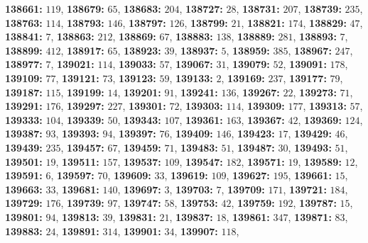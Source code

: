\textsf{\bfseries 138661:} $119$, \textsf{\bfseries 138679:} $65$, \textsf{\bfseries 138683:} $204$, \textsf{\bfseries 138727:} $28$, \textsf{\bfseries 138731:} $207$, \textsf{\bfseries 138739:} $235$, \textsf{\bfseries 138763:} $114$, \textsf{\bfseries 138793:} $146$, \textsf{\bfseries 138797:} $126$, \textsf{\bfseries 138799:} $21$, \textsf{\bfseries 138821:} $174$, \textsf{\bfseries 138829:} $47$, \textsf{\bfseries 138841:} $7$, \textsf{\bfseries 138863:} $212$, \textsf{\bfseries 138869:} $67$, \textsf{\bfseries 138883:} $138$, \textsf{\bfseries 138889:} $281$, \textsf{\bfseries 138893:} $7$, \textsf{\bfseries 138899:} $412$, \textsf{\bfseries 138917:} $65$, \textsf{\bfseries 138923:} $39$, \textsf{\bfseries 138937:} $5$, \textsf{\bfseries 138959:} $385$, \textsf{\bfseries 138967:} $247$, \textsf{\bfseries 138977:} $7$, \textsf{\bfseries 139021:} $114$, \textsf{\bfseries 139033:} $57$, \textsf{\bfseries 139067:} $31$, \textsf{\bfseries 139079:} $52$, \textsf{\bfseries 139091:} $178$, \textsf{\bfseries 139109:} $77$, \textsf{\bfseries 139121:} $73$, \textsf{\bfseries 139123:} $59$, \textsf{\bfseries 139133:} $2$, \textsf{\bfseries 139169:} $237$, \textsf{\bfseries 139177:} $79$, \textsf{\bfseries 139187:} $115$, \textsf{\bfseries 139199:} $14$, \textsf{\bfseries 139201:} $91$, \textsf{\bfseries 139241:} $136$, \textsf{\bfseries 139267:} $22$, \textsf{\bfseries 139273:} $71$, \textsf{\bfseries 139291:} $176$, \textsf{\bfseries 139297:} $227$, \textsf{\bfseries 139301:} $72$, \textsf{\bfseries 139303:} $114$, \textsf{\bfseries 139309:} $177$, \textsf{\bfseries 139313:} $57$, \textsf{\bfseries 139333:} $104$, \textsf{\bfseries 139339:} $50$, \textsf{\bfseries 139343:} $107$, \textsf{\bfseries 139361:} $163$, \textsf{\bfseries 139367:} $42$, \textsf{\bfseries 139369:} $124$, \textsf{\bfseries 139387:} $93$, \textsf{\bfseries 139393:} $94$, \textsf{\bfseries 139397:} $76$, \textsf{\bfseries 139409:} $146$, \textsf{\bfseries 139423:} $17$, \textsf{\bfseries 139429:} $46$, \textsf{\bfseries 139439:} $235$, \textsf{\bfseries 139457:} $67$, \textsf{\bfseries 139459:} $71$, \textsf{\bfseries 139483:} $51$, \textsf{\bfseries 139487:} $30$, \textsf{\bfseries 139493:} $51$, \textsf{\bfseries 139501:} $19$, \textsf{\bfseries 139511:} $157$, \textsf{\bfseries 139537:} $109$, \textsf{\bfseries 139547:} $182$, \textsf{\bfseries 139571:} $19$, \textsf{\bfseries 139589:} $12$, \textsf{\bfseries 139591:} $6$, \textsf{\bfseries 139597:} $70$, \textsf{\bfseries 139609:} $33$, \textsf{\bfseries 139619:} $109$, \textsf{\bfseries 139627:} $195$, \textsf{\bfseries 139661:} $15$, \textsf{\bfseries 139663:} $33$, \textsf{\bfseries 139681:} $140$, \textsf{\bfseries 139697:} $3$, \textsf{\bfseries 139703:} $7$, \textsf{\bfseries 139709:} $171$, \textsf{\bfseries 139721:} $184$, \textsf{\bfseries 139729:} $176$, \textsf{\bfseries 139739:} $97$, \textsf{\bfseries 139747:} $58$, \textsf{\bfseries 139753:} $42$, \textsf{\bfseries 139759:} $192$, \textsf{\bfseries 139787:} $15$, \textsf{\bfseries 139801:} $94$, \textsf{\bfseries 139813:} $39$, \textsf{\bfseries 139831:} $21$, \textsf{\bfseries 139837:} $18$, \textsf{\bfseries 139861:} $347$, \textsf{\bfseries 139871:} $83$, \textsf{\bfseries 139883:} $24$, \textsf{\bfseries 139891:} $314$, \textsf{\bfseries 139901:} $34$, \textsf{\bfseries 139907:} $118$, 
